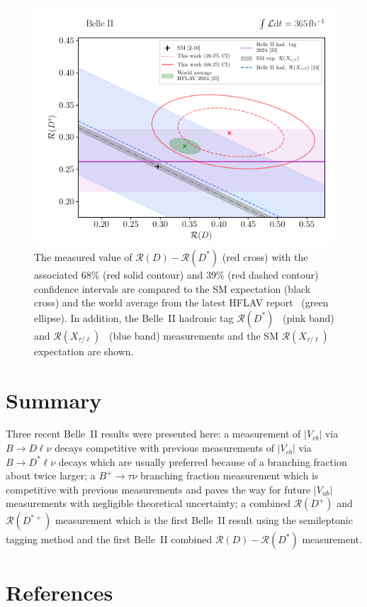 \documentclass{moriond}
\def\vub{V_{ub}}
\def\vcb{V_{cb}}
\def\btodlnu{B \to D\ell\nu}
\def\btodstlnu{B \to D^*\ell\nu}
\def\rd{\mathcal{R}\left(D\right)}
\def\rdp{\mathcal{R}\left(D^+\right)}
\def\rdst{\mathcal{R}\left(D^*\right)}
\def\rdstp{\mathcal{R}\left(D^{*+}\right)}
\begin{document}
\begin{figure}[h!]
    \centering
    \includegraphics[scale=0.9]{Figures/rd_comp.pdf}
    \caption{The measured value of $\rd-\rdst$ (red cross) with the associated $68\%$ (red solid contour) and $39\%$ (red dashed contour) confidence intervals are compared to the SM expectation (black cross) and the world average from the latest HFLAV report~\cite{hflav} (green ellipse). In addition, the Belle~II hadronic tag $\rdst$~\cite{kojima} (pink band) and $\mathcal{R}(X_{\tau/\ell})$~\cite{henrik} (blue band) measurements and the SM $\mathcal{R}(X_{\tau/\ell})$ expectation are shown.}
    \label{fig:rd_comp}
\end{figure}

\section{Summary}
Three recent Belle~II results were presented here: a measurement of $|\vcb|$ via $\btodlnu$ decays competitive with previous measurements of $|\vcb|$ via $\btodstlnu$ decays which are usually preferred because of a branching fraction about twice larger; a $B^+ \to \tau\nu$ branching fraction measurement which is competitive with previous measurements and paves the way for future $|\vub|$ measurements with negligible theoretical uncertainty; a combined $\rdp$ and $\rdstp$ measurement which is the first Belle~II result using the semileptonic tagging method and the first Belle~II combined $\rd-\rdst$ measurement.


\section*{References}
\end{document}
